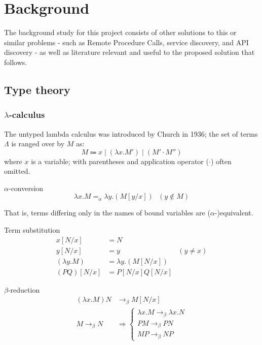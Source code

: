 \section{Background}\label{bg}

The background study for this project consists of other solutions to this or similar problems - such as Remote Procedure Calls, service discovery, and API discovery - as well as literature relevant and useful to the proposed solution that follows.

\subsection{Type theory}\label{bg:types}

\subsubsection{$\lambda$-calculus}\label{bg:types:lambda-calculus}
The untyped lambda calculus was introduced by Church in 1936; the set of terms $\Lambda$ is ranged over by $M$ as: $$
M \Coloneqq x \mid (\lambda{x}.M') \mid (M' \cdot M'')
$$ where $x$ is a variable; with parentheses and application operator ($\cdot$) often omitted. \cite{tsfpl}

\begin{defn}$\alpha$-conversion\label{def:types:alpha-conversion}
	$$
	\lambda{x}.M =_{\alpha} \lambda{y}.(M[y/x]) \ \ \ (y\notin{M})
	$$
\end{defn}

That is, terms differing only in the names of bound variables are ($\alpha$-)equivalent.

\begin{defn}Term substitution\label{def:types:term-substitution}
	$$
	\begin{aligned}
		x[N/x] &= N \\
		y[N/x] &= y &(y \neq x) \\
		(\lambda{y}.M) &= \lambda{y}.(M[N/x]) \\
		(PQ)[N/x] &= P[N/x]Q[N/x]
	\end{aligned}
	$$
\end{defn}

\begin{defn}$\beta$-reduction\label{def:types:beta-conversion}
	$$
	\begin{aligned}
		(\lambda{x}.M)N &\to_{\beta} M[N/x] \\
		M \to_{\beta} N &\Rightarrow \begin{cases}
 			\lambda{x}.M \to_{\beta} \lambda{x}.N \\
 			PM \to_{\beta} PN \\
 			MP \to_{\beta} NP
 		\end{cases}
	\end{aligned}
	$$
\end{defn}

